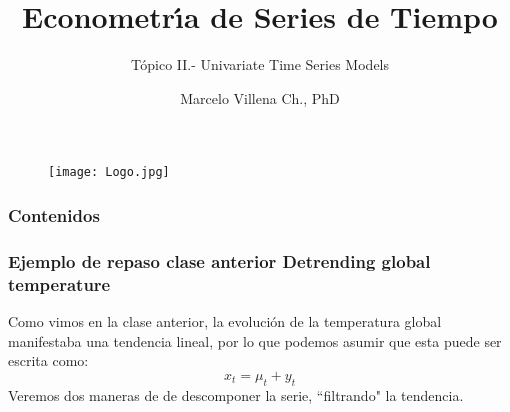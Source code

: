 \documentclass[spanish,xcolor=table]{beamer}
\title[ECO -TS101]{Econometr\'\i{}a de Series de Tiempo}
\subtitle{T\'opico II.- Univariate Time Series Models}
\author{Marcelo Villena Ch., PhD}
\institute[UAI] %
{
Universidad Adolfo Ib\'a\~nez 
 \\ %
\medskip
}
\date{} %
\begin{document}
\begin{frame}

\begin{figure}[t!]
\texttt{[image: Logo.jpg]}
\end{figure}
\titlepage %
\end{frame}

\begin{frame}
\frametitle{Contenidos} 
\tableofcontents %
\end{frame}




\begin{frame}
\frametitle{Ejemplo de repaso clase anterior\newline
Detrending global temperature}
Como vimos en la clase anterior, la evoluci\'on de la temperatura global manifestaba una tendencia lineal, por lo que podemos asumir que esta puede ser escrita como:
\begin{equation*} 
x_t =\mu_{t} + y_t
\end{equation*}
 Veremos dos maneras de de descomponer la serie, ``filtrando" la tendencia.
\end{frame}
\end{document}
